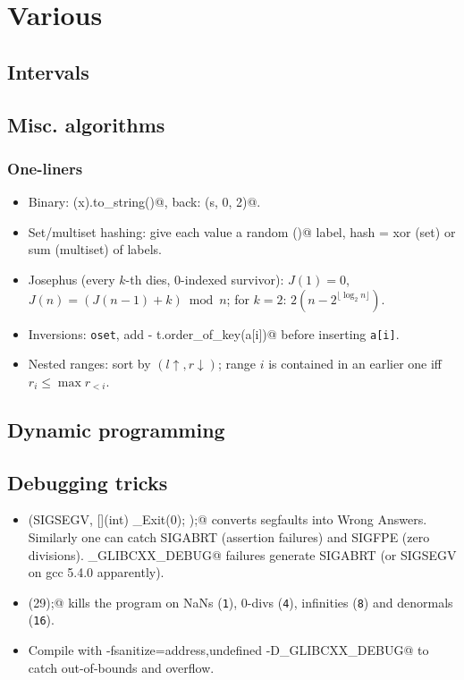 \chapter{Various}

\section{Intervals}

\section{Misc. algorithms}
	\subsection{One-liners}
		\begin{itemize}
			\item Binary: \verb@bitset<64>(x).to_string()@, back: \verb@stoll(s, 0, 2)@.
			\item Set/multiset hashing: give each value a random \verb@rng()@ label, hash = xor (set) or sum (multiset) of labels.
			\item Josephus (every $k$-th dies, 0-indexed survivor): $J(1)=0$, $J(n)=(J(n-1)+k) \bmod n$; for $k=2$: $2(n-2^{\lfloor\log_2 n\rfloor})$.
			\item Inversions: \texttt{oset}, add \verb@i - t.order_of_key(a[i])@ before inserting \texttt{a[i]}.
			\item Nested ranges: sort by $(l\uparrow, r\downarrow)$; range $i$ is contained in an earlier one iff $r_i \le \max r_{<i}$.
		\end{itemize}

\section{Dynamic programming}

\section{Debugging tricks}
	\begin{itemize}
		\item \verb@signal(SIGSEGV, [](int) { _Exit(0); });@ converts segfaults into Wrong Answers.
			Similarly one can catch SIGABRT (assertion failures) and SIGFPE (zero divisions).
			\verb@_GLIBCXX_DEBUG@ failures generate SIGABRT (or SIGSEGV on gcc 5.4.0 apparently).
		\item \verb@feenableexcept(29);@ kills the program on NaNs (\texttt 1), 0-divs (\texttt 4), infinities (\texttt 8) and denormals (\texttt{16}).
		\item Compile with \verb@-fsanitize=address,undefined -D_GLIBCXX_DEBUG@ to catch out-of-bounds and overflow.
	\end{itemize}

